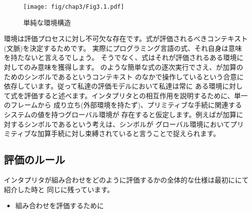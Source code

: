 \begin{figure}[tb]
\label{Figure 3.1}
\centering
\begin{comment}
\heading{Figure 3.1:} A simple environment structure.

\begin{example}
           +--------+
           |      I |
           | x: 3   |
           | y: 5   |
           +--------+
              ^  ^
              |  |
            C |  | D
+---------+   |  |   +----------+
|      II |   |  |   |      III |
| z: 6    +---+  +---+ m: 1     |
| x: 7    |          | y: 2     |
+---------+          +----------+
\end{example}
\end{comment}
\texttt{[image: fig/chap3/Fig3.1.pdf]}
\par\bigskip
\noindent
{} 単純な環境構造
\end{figure}

\noindent
環境は評価プロセスに対し不可欠な存在です。式が評価されるべきコンテキスト(文脈)を決定するためです。
実際にプログラミング言語の式、それ自身は意味を持たないと言えるでしょう。
そうでなく、式はそれが評価されるある環境に対してのみ意味を獲得します。
のような簡単な式の逐次実行でさえ、\code{+}が加算のためのシンボルであるというコンテキスト
のなかで操作しているという合意に依存しています。従って私達の評価モデルにおいて私達は常に
ある環境に対して式を評価すると述べます。インタプリタとの相互作用を説明するために、単一のフレームから
成り立ち(外部環境を持たず)、プリミティブな手続に関連するシステムの値を持つグローバル環境が
存在すると仮定します。例えば\code{+}が加算に対するシンボルであるという考えは、シンボル\code{+}が
グローバル環境においてプリミティブな加算手続に対し束縛されていると言うことで捉えられます。



\subsection{評価のルール}
\label{Section 3.2.1}



インタプリタが組み合わせをどのように評価するかの全体的な仕様は最初ににて紹介した時と
同じに残っています。

\begin{itemize}

\item
組み合わせを評価するために

\end{itemize}

